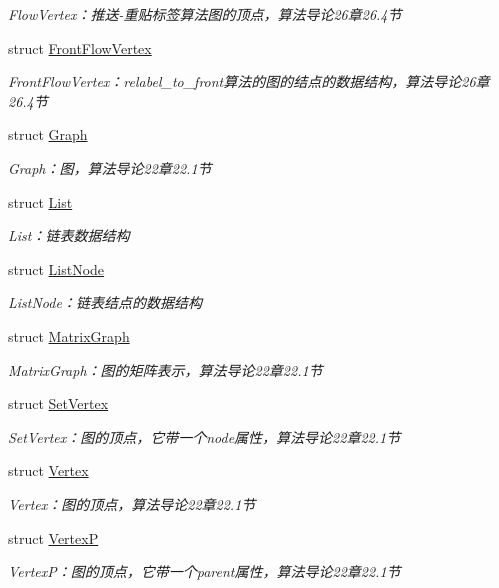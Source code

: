 \begin{DoxyCompactItemize}
\begin{DoxyCompactList}\small\item\em Flow\+Vertex：推送-\/重贴标签算法图的顶点，算法导论26章26.4节 \end{DoxyCompactList}\item 
struct \hyperlink{struct_introduction_to_algorithm_1_1_graph_algorithm_1_1_front_flow_vertex}{Front\+Flow\+Vertex}
\begin{DoxyCompactList}\small\item\em Front\+Flow\+Vertex：relabel\+\_\+to\+\_\+front算法的图的结点的数据结构，算法导论26章26.4节 \end{DoxyCompactList}\item 
struct \hyperlink{struct_introduction_to_algorithm_1_1_graph_algorithm_1_1_graph}{Graph}
\begin{DoxyCompactList}\small\item\em Graph：图，算法导论22章22.1节 \end{DoxyCompactList}\item 
struct \hyperlink{struct_introduction_to_algorithm_1_1_graph_algorithm_1_1_list}{List}
\begin{DoxyCompactList}\small\item\em List：链表数据结构 \end{DoxyCompactList}\item 
struct \hyperlink{struct_introduction_to_algorithm_1_1_graph_algorithm_1_1_list_node}{List\+Node}
\begin{DoxyCompactList}\small\item\em List\+Node：链表结点的数据结构 \end{DoxyCompactList}\item 
struct \hyperlink{struct_introduction_to_algorithm_1_1_graph_algorithm_1_1_matrix_graph}{Matrix\+Graph}
\begin{DoxyCompactList}\small\item\em Matrix\+Graph：图的矩阵表示，算法导论22章22.1节 \end{DoxyCompactList}\item 
struct \hyperlink{struct_introduction_to_algorithm_1_1_graph_algorithm_1_1_set_vertex}{Set\+Vertex}
\begin{DoxyCompactList}\small\item\em Set\+Vertex：图的顶点，它带一个node属性，算法导论22章22.1节 \end{DoxyCompactList}\item 
struct \hyperlink{struct_introduction_to_algorithm_1_1_graph_algorithm_1_1_vertex}{Vertex}
\begin{DoxyCompactList}\small\item\em Vertex：图的顶点，算法导论22章22.1节 \end{DoxyCompactList}\item 
struct \hyperlink{struct_introduction_to_algorithm_1_1_graph_algorithm_1_1_vertex_p}{Vertex\+P}
\begin{DoxyCompactList}\small\item\em Vertex\+P：图的顶点，它带一个parent属性，算法导论22章22.1节 \end{DoxyCompactList}\end{DoxyCompactItemize}
